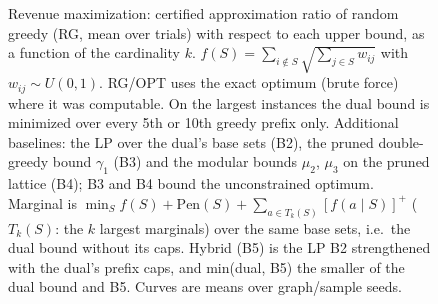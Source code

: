 \begin{figure}[t]
\centering
\setlength{\rgplotwidth}{0.49\columnwidth}
\\[1pt]
\hfill
\\
\hfill

\caption{Revenue maximization: certified approximation ratio of random greedy (RG, mean over trials) with respect to each upper bound, as a function of the cardinality $k$. $f(S)=\sum_{i\notin S}\sqrt{\sum_{j\in S} w_{ij}}$ with $w_{ij}\sim U(0,1)$. RG/OPT uses the exact optimum (brute force) where it was computable. On the largest instances the dual bound is minimized over every 5th or 10th greedy prefix only. Additional baselines: the LP over the dual's base sets (B2), the pruned double-greedy bound $\gamma_1$ (B3) and the modular bounds $\mu_2$, $\mu_3$ on the pruned lattice (B4); B3 and B4 bound the unconstrained optimum. Marginal is $\min_S f(S)+\mathrm{Pen}(S)+\sum_{a\in T_k(S)}[f(a\mid S)]^+$ ($T_k(S)$: the $k$ largest marginals) over the same base sets, i.e.\ the dual bound without its caps. Hybrid (B5) is the LP B2 strengthened with the dual's prefix caps, and min(dual, B5) the smaller of the dual bound and B5. Curves are means over graph/sample seeds.}
\label{fig:rg-revenue_max-hybrid}
\end{figure}
